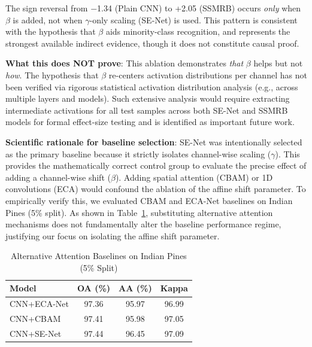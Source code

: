 \documentclass[conference]{IEEEtran}
\begin{document}
{The sign reversal from $-$1.34 (Plain CNN) to +2.05 (SSMRB) occurs \textit{only} when $\beta$ is added, not when $\gamma$-only scaling (SE-Net) is used. This pattern is consistent with the hypothesis that $\beta$ aids minority-class recognition, and represents the strongest available indirect evidence, though it does not constitute causal proof.

\textbf{What this does NOT prove}: This ablation demonstrates \textit{that} $\beta$ helps but not \textit{how}. The hypothesis that $\beta$ re-centers activation distributions per channel has not been verified via rigorous statistical activation distribution analysis (e.g., across multiple layers and models). Such extensive analysis would require extracting intermediate activations for all test samples across both SE-Net and SSMRB models for formal effect-size testing and is identified as important future work.

\textbf{Scientific rationale for baseline selection}: SE-Net was intentionally selected as the primary baseline because it strictly isolates channel-wise scaling ($\gamma$). This provides the mathematically correct control group to evaluate the precise effect of adding a channel-wise shift ($\beta$). Adding spatial attention (CBAM) or 1D convolutions (ECA) would confound the ablation of the affine shift parameter. To empirically verify this, we evaluated CBAM and ECA-Net baselines on Indian Pines (5\% split). As shown in Table~\ref{tab:attention_baselines}, substituting alternative attention mechanisms does not fundamentally alter the baseline performance regime, justifying our focus on isolating the affine shift parameter.

\begin{table}[!h]
\caption{Alternative Attention Baselines on Indian Pines (5\% Split)}
\label{tab:attention_baselines}
\centering
\begin{tabular}{lccc}
\toprule
\textbf{Model} & \textbf{OA (\%)} & \textbf{AA (\%)} & \textbf{Kappa} \\
\midrule
CNN+ECA-Net & 97.36 & 95.97 & 96.99 \\
CNN+CBAM & 97.41 & 95.98 & 97.05 \\
CNN+SE-Net & 97.44 & 96.45 & 97.09 \\
\bottomrule
\end{tabular}
\end{table}

}
\end{document}
